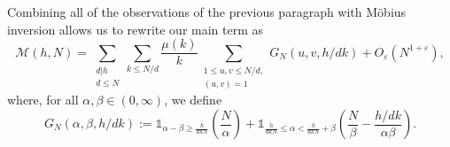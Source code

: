 \documentclass[12pt,reqno]{amsart}
\theoremstyle{definition}
\theoremstyle{remark}
\numberwithin{equation}{section}
\renewcommand{\geq}{\geqslant}
\renewcommand{\leq}{\leqslant}
\def\eps{\varepsilon}
\def \cM {\mathcal M}
\newcommand\1{\mathds{1}}
\begin{document}
Combining all of the observations of the previous paragraph with M\"obius inversion allows us to rewrite our main term as
\begin{equation*}
    \cM(h,N) = \sum_{\substack{d|h \\ d \leqslant N}}\sum_{k\leqslant N/d}\frac{\mu(k)}{k} \sum_{\substack{1 \leq u,v \leq N/d,\\ (u,v) = 1}}G_N(u,v,h/dk) + O_\eps(N^{1+\eps}),
\end{equation*}
where, for all $\alpha,\beta\in(0,\infty)$, we define
\begin{equation*}
    G_N(\alpha,\beta,h/dk) := \1_{\alpha -\beta \geq \frac{h}{dkN}} \left( \frac{N}{\alpha} \right) + \1_{\frac{h}{dkN}\leq \alpha < \frac{h}{dkN}+ \beta}\left( \frac{N}{\beta} - \frac{h/dk}{\alpha\beta}\right).
\end{equation*}
\end{document}
